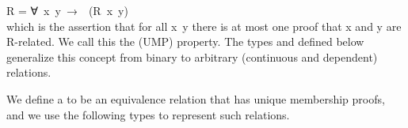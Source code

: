  \ab R = \as ∀~\ab x~\ab y~\as →~~(\ab R~\ab x~\ab y)\\[4pt]
which is the assertion that for all \ab x~\ab y there is at most one proof that
\ab x and \ab y are \ab R-related. 
We call this the  (UMP) property.  The
types  and  defined below generalize this concept
from binary to arbitrary (continuous and dependent) relations.

We define a  to be an equivalence relation that has unique membership proofs, and we use the following types to represent such relations.
\ccpad
\begin{code}%
\>[0][@{}l@{\AgdaIndent{0}}]%
\>[1]\AgdaSpace{}%
\AgdaSpace{}%
\AgdaSymbol{\{}\AgdaSpace{}%
\AgdaSymbol{:}\AgdaSpace{}%
\AgdaSpace{}%
\AgdaSymbol{\}(}\AgdaSpace{}%
\AgdaSymbol{:}\AgdaSpace{}%
\AgdaSpace{}%
\AgdaSpace{}%
\AgdaSymbol{)}\AgdaSpace{}%
\AgdaSymbol{:}\AgdaSpace{}%
\AgdaSpace{}%
\AgdaSpace{}%
\AgdaSpace{}%
\AgdaSpace{}%
\<%
\\
\>[1][@{}l@{\AgdaIndent{0}}]%
\>[2]%
\>[369I]\AgdaSpace{}%
\AgdaSymbol{:}\AgdaSpace{}%
\AgdaSpace{}%
\<%
\\
\>[.][@{}l@{}]\<[369I]%
\>[8]\AgdaSpace{}%
\AgdaSymbol{:}\AgdaSpace{}%
\AgdaSpace{}%
\<%
\\
%
\\[\AgdaEmptyExtraSkip]%
%
\>[1]\AgdaSpace{}%
\AgdaSymbol{:}\AgdaSpace{}%
\AgdaSpace{}%
\AgdaSpace{}%
\AgdaSpace{}%
\AgdaSpace{}%
\AgdaSpace{}%
\AgdaSpace{}%
\AgdaSpace{}%
\<%
\\
%
\>[1]\AgdaSpace{}%
\AgdaSpace{}%
\AgdaSymbol{=}\AgdaSpace{}%
\AgdaSpace{}%
\AgdaSpace{}%
\AgdaSpace{}%
\AgdaSpace{}%
\AgdaSpace{}%
\AgdaSpace{}%
\AgdaFunction{,}\AgdaSpace{}%
\AgdaSpace{}%
\<%
\end{code}


